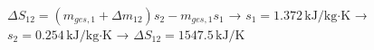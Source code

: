 \( \Delta S_{12} = (m_{ges,1} + \Delta m_{12}) s_2 - m_{ges,1} s_1 \)  
→ \( s_1 = 1.372 \, \text{kJ/kg·K} \)  
→ \( s_2 = 0.254 \, \text{kJ/kg·K} \)  
→ \( \Delta S_{12} = 1547.5 \, \text{kJ/K} \)